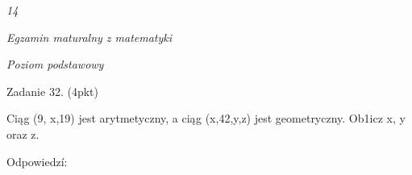 \documentclass[a4paper,12pt]{article}
\begin{document}
{\it 14}

{\it Egzamin maturalny z matematyki}

{\it Poziom podstawowy}

Zadanie 32. (4pkt)

Ciąg (9, x,19) jest arytmetyczny, a ciąg (x,42,y,z) jest geometryczny. Ob1icz x, y oraz z.

Odpowiedzí:
\end{document}
